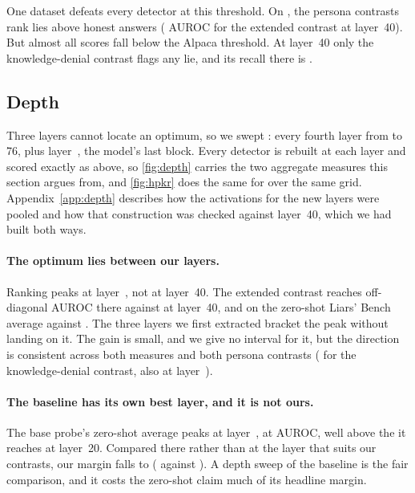 One dataset defeats every detector at this threshold. On \hpc, the persona contrasts rank lies
above honest answers ( AUROC for the extended contrast at layer~40). But almost
all \hpc{} scores fall below the Alpaca threshold. At layer~40 only the knowledge-denial contrast
flags any \hpc{} lie, and its recall there is .

\subsection{Depth}
\label{sec:depth}

Three layers cannot locate an optimum, so we swept : every fourth layer from
 to 76, plus layer~, the model's last block. Every detector is rebuilt
at each layer and scored exactly as above, so \cref{fig:depth} carries the two aggregate measures
this section argues from, and \cref{fig:hpkr} does the same for \hpkr{} over the same grid.
Appendix~\ref{app:depth} describes how the activations for the new layers were pooled and how that
construction was checked against layer~40, which we had built both ways.

\paragraph{The optimum lies between our layers.} Ranking peaks at
layer~, not at layer~40. The extended contrast reaches
 off-diagonal AUROC there against  at layer~40, and
 on the zero-shot Liars' Bench average against . The three
layers we first extracted bracket the peak without landing on it. The gain is small, and we give
no interval for it, but the direction is consistent across both measures and both persona
contrasts ( for the knowledge-denial contrast, also at
layer~).

\paragraph{The baseline has its own best layer, and it is not ours.} The base probe's zero-shot
average peaks at layer~, at  AUROC, well above
the  it reaches at layer~20. Compared there rather than at the layer that suits
our contrasts, our margin falls to 
( against ). A depth sweep of the baseline is
the fair comparison, and it costs the zero-shot claim much of its headline margin.

